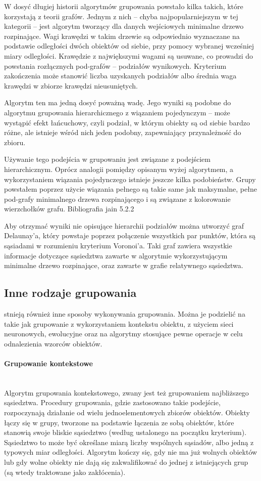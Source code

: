 \documentclass{article}
\newcommand{\myparagraph}[1]{\paragraph{#1}\mbox{}\\}
\begin{document}
W dosyć długiej historii algorytmów grupowania powstało kilka takich, które korzystają z teorii grafów. Jednym z nich – chyba najpopularniejszym w tej kategorii – jest algorytm tworzący dla danych wejściowych minimalne drzewo rozpinające. Wagi krawędzi w takim drzewie są odpowiednio wyznaczane na podstawie odległości dwóch obiektów od siebie, przy pomocy wybranej wcześniej miary odległości. Krawędzie z największymi wagami są usuwane, co prowadzi do powstania rozłącznych pod-grafów – podziałów wynikowych. Kryterium zakończenia może stanowić liczba uzyskanych podziałów albo średnia waga krawędzi w zbiorze krawędzi nieusuniętych.

Algorytm ten ma jedną dosyć poważną wadę. Jego wyniki są podobne do algorytmu grupowania hierarchicznego z wiązaniem pojedynczym – może wystąpić efekt łańcuchowy, czyli podział, w którym obiekty są od siebie bardzo różne, ale istnieje wśród nich jeden podobny, zapewniający przynależność do zbioru.

Używanie tego podejścia w grupowaniu jest związane z podejściem hierarchicznym. Oprócz analogii pomiędzy opisanym wyżej algorytmem, a wykorzystaniem wiązania pojedynczego istnieje jeszcze kilka podobieństw. Grupy powstałem poprzez użycie wiązania pełnego są takie same jak maksymalne, pełne pod-grafy minimalnego drzewa rozpinającego i są związane z kolorowanie wierzchołków grafu. Bibliografia jain 5.2.2

Aby otrzymać wyniki nie opisujące hierarchii podziałów można utworzyć graf Delaunay'a,  który powstaje poprzez połączenie wszystkich par punktów, która są sąsiadami w rozumieniu kryterium Voronoi'a. Taki graf zawiera wszystkie informacje dotyczące sąsiedztwa zawarte w  algorytmie wykorzystującym minimalne drzewo rozpinające, oraz zawarte w grafie relatywnego sąsiedztwa.

\subsection{Inne rodzaje grupowania}

stnieją również inne sposoby wykonywania grupowania. Można je podzielić na takie jak grupowanie z wykorzystaniem kontekstu obiektu, z użyciem sieci neuronowych, ewolucyjne oraz na algorytmy stosujące pewne operacje w celu odnalezienia wzorców obiektów.

\myparagraph{Grupowanie kontekstowe}

Algorytm grupowania kontekstowego, zwany jest też grupowaniem najbliższego sąsiedztwa. Procedury grupowania, gdzie zastosowano takie podejście, rozpoczynają działanie od wielu jednoelementowych zbiorów obiektów. Obiekty łączy się w grupy, tworzone na podstawie łączenia ze sobą obiektów, które stanowią swoje bliskie sąsiedztwo (według ustalonego na początku kryterium). Sąsiedztwo to może być określane miarą liczby wspólnych sąsiadów, albo jedną z typowych miar odległości. Algorytm kończy się, gdy nie ma już wolnych obiektów lub gdy wolne obiekty nie dają się zakwalifikować do jednej z istniejących grup (są wtedy traktowane jako zakłócenia).
\end{document}
